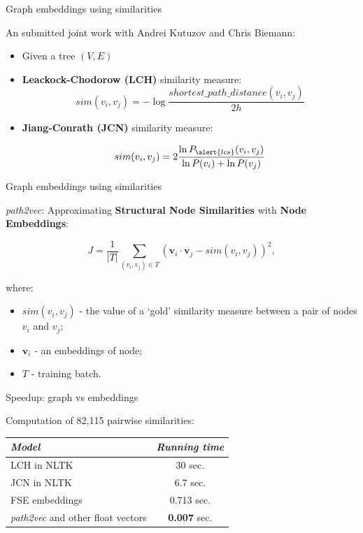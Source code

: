 \begin{frame}{Graph embeddings using similarities}

An submitted joint work with Andrei Kutuzov and Chris Biemann:


\begin{itemize}
\item Given a tree $(V, E)$

\item \alert{\textbf{Leackock-Chodorow (LCH)}} similarity measure:
$$
sim(v_i, v_j)= −\log\frac{shortest\_path\_distance(v_i, v_j) }{2h} 
$$

\pause 
\item \alert{\textbf{Jiang-Conrath (JCN)}} similarity measure:

$$
sim(v_i, v_j) = 2 \frac{\ln P_{\alert{lcs}}(v_i, v_j)}{\ln P(v_i) + \ln P(v_j)} 
$$
\end{itemize}
	
\end{frame}



\begin{frame}{Graph embeddings using similarities}


\textit{path2vec}: Approximating \alert{\textbf{Structural Node Similarities}} with \textbf{Node Embeddings}:

$$
J = \frac{1}{|T|}  \sum_{ (v_i, v_j) \in T }  (\mathbf{v}_i \cdot \mathbf{v}_j - sim(v_i, v_j) )^2,
$$

where:

\begin{itemize}
	\item $sim(v_i, v_j)$ - the value of a `gold' similarity measure between a pair of nodes $v_i$ and $v_j$;
	\item $\mathbf{v}_i$ - an embeddings of node;
	\item $T$ - training batch.
\end{itemize}

\end{frame}

\begin{frame}{Speedup: graph vs embeddings}	

Computation of 82,115 pairwise similarities:

\begin{table}
\begin{tabular}{lc}
\toprule
\textit{Model} & \textit{Running time} \\
\midrule
LCH in NLTK & 30 sec. \\
JCN in NLTK & 6.7 sec. \\
FSE embeddings & 0.713 sec. \\
\textit{path2vec} and other float vectors & \textbf{0.007} sec. \\
\bottomrule
\end{tabular}
\end{table}

\end{frame}


